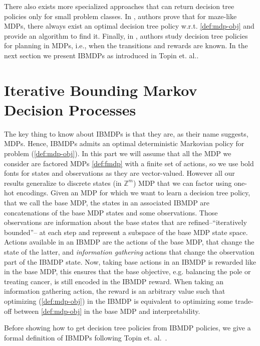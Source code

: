 There also exists more specialized approaches that can return decision tree policies only for small problem classes.
In \cite{dt-maze}, authors prove that for maze-like MDPs, there always exist an optimal decision tree policy w.r.t. \ref{def:mdp-obj} and provide an algorithm to find it. 
Finally, in \cite{dt-opt-mdp}, authors study decision tree policies for planning in MDPs, i.e., when the transitions and rewards are known.
In the next section we present IBMDPs as introduced in Topin et. al.\cite{topin2021iterative}.

\section{Iterative Bounding Markov Decision Processes}\label{sec:ibmdp}

The key thing to know about IBMDPs is that they are, as their name suggests, MDPs.
Hence, IBMDPs admits an optimal deterministic Markovian policy for problem (\ref{def:mdp-obj}).
In this part we will assume that all the MDP we consider are factored MDPs \ref{def:fmdp} with a finite set of actions, so we use bold fonts for states and observations as they are vector-valued.
However all our results generalize to discrete states (in $\mathbb{Z}^m$) MDP that we can factor using one-hot encodings. 
Given an MDP for which we want to learn a decision tree policy, that we call the base MDP, the states in an associated IBMDP are concatenations of the base MDP states and some observations. 
Those observations are information about the base states that are refined--``iteratively bounded''-- at each step and represent a subspace of the base MDP state space.
Actions available in an IBMDP are the actions of the base MDP, that change the state of the latter, and \textit{information gathering} actions that change the observation part of the IBMDP state.
Now, taking base actions in an IBMDP is rewarded like in the base MDP, this ensures that the base objective, e.g. balancing the pole or treating cancer, is still encoded in the IBMDP reward.
When taking an information gathering action, the reward is an arbitrary value such that optimizing (\ref{def:mdp-obj}) in the IBMDP is equivalent to optimizing some trade-off between \ref{def:mdp-obj} in the base MDP and interpretability.
 
Before showing how to get decision tree policies from IBMDP policies, we give a formal definition of IBMDPs following Topin et. al.~\cite{topin2021iterative}.

